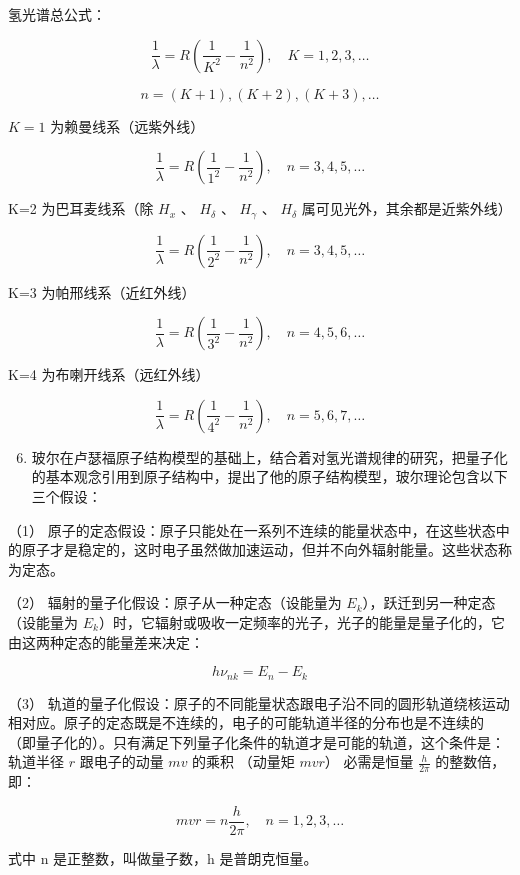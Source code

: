 氢光谱总公式：

\[
\frac {1}{\lambda} = R \left(\frac {1}{K ^ {2}} - \frac {1}{n ^ {2}}\right), \quad K = 1, 2, 3, \dots
\]

\[
n = (K + 1), (K + 2), (K + 3), \dots
\]

\(K = 1\) 为赖曼线系（远紫外线）

\[
\frac {1}{\lambda} = R \left(\frac {1}{1 ^ {2}} - \frac {1}{n ^ {2}}\right), \quad n = 3, 4, 5, \dots
\]

K=2 为巴耳麦线系（除 \(H_{x}\) 、 \(H_{\delta}\) 、 \(H_{\gamma}\) 、
\(H_{\delta}\) 属可见光外，其余都是近紫外线）

\[
\frac {1}{\lambda} = R \left(\frac {1}{2 ^ {2}} - \frac {1}{n ^ {2}}\right), \quad n = 3, 4, 5, \dots
\]

K=3 为帕邢线系（近红外线）

\[
\frac {1}{\lambda} = R \left(\frac {1}{3 ^ {2}} - \frac {1}{n ^ {2}}\right), \quad n = 4, 5, 6, \dots
\]

K=4 为布喇开线系（远红外线）

\[
\frac {1}{\lambda} = R \left(\frac {1}{4 ^ {2}} - \frac {1}{n ^ {2}}\right), \quad n = 5, 6, 7, \dots
\]

\begin{enumerate}
\setcounter{enumi}{5}
\item
  玻尔在卢瑟福原子结构模型的基础上，结合着对氢光谱规律的研究，把量子化的基本观念引用到原子结构中，提出了他的原子结构模型，玻尔理论包含以下三个假设：
\end{enumerate}

（1）
原子的定态假设：原子只能处在一系列不连续的能量状态中，在这些状态中的原子才是稳定的，这时电子虽然做加速运动，但并不向外辐射能量。这些状态称为定态。

（2） 辐射的量子化假设：原子从一种定态（设能量为
\(E_{k}\)），跃迁到另一种定态（设能量为
\(E_{k}\)）时，它辐射或吸收一定频率的光子，光子的能量是量子化的，它由这两种定态的能量差来决定：

\[
h \nu_ {n k} = E _ {n} - E _ {k}
\]

（3）
轨道的量子化假设：原子的不同能量状态跟电子沿不同的圆形轨道绕核运动相对应。原子的定态既是不连续的，电子的可能轨道半径的分布也是不连续的
（即量子化的）。只有满足下列量子化条件的轨道才是可能的轨道，这个条件是：轨道半径
\(r\) 跟电子的动量 \(mv\) 的乘积 （动量矩 \(mvr\)） 必需是恒量
\(\frac{h}{2\pi}\) 的整数倍，即：

\[
m v r = n \frac {h}{2 \pi}, \quad n = 1, 2, 3, \dots
\]

式中 n 是正整数，叫做量子数，h 是普朗克恒量。

